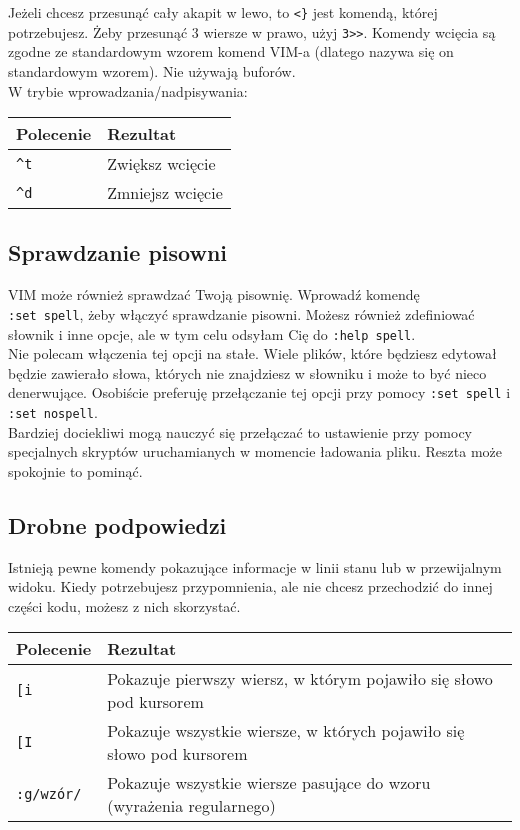 \documentclass[a4paper,12pt]{article}
\begin{document}
\noindent
Jeżeli chcesz przesunąć cały akapit w lewo, to {\tt <\}} jest komendą, której potrzebujesz. Żeby przesunąć 3 wiersze w prawo, użyj {\tt 3>>}. Komendy wcięcia są zgodne ze standardowym wzorem komend VIM-a (dlatego nazywa się on standardowym wzorem). Nie używają buforów.\\
W trybie wprowadzania/nadpisywania:

\begin{tabular}{ l | p{} } 
{\bf Polecenie} & {\bf Rezultat} \\ \hline
{\tt \^{}t} & Zwiększ wcięcie \\
{\tt \^{}d} & Zmniejsz wcięcie \\ \hline
\end{tabular}
\subsection{Sprawdzanie pisowni}
VIM może również sprawdzać Twoją pisownię. Wprowadź komendę\\{\tt :set spell}, żeby włączyć sprawdzanie pisowni. Możesz również zdefiniować słownik i inne opcje, ale w tym celu odsyłam Cię do {\tt :help spell}.\\
Nie polecam włączenia tej opcji na stałe. Wiele plików, które będziesz edytował będzie zawierało słowa, których nie znajdziesz w słowniku i może to być nieco denerwujące. Osobiście preferuję przełączanie tej opcji przy pomocy {\tt :set spell} i {\tt :set nospell}.\\
Bardziej dociekliwi mogą nauczyć się przełączać to ustawienie przy pomocy specjalnych skryptów uruchamianych w momencie ładowania pliku. Reszta może spokojnie to pominąć.\\
\subsection{Drobne podpowiedzi}
Istnieją pewne komendy pokazujące informacje w linii stanu lub w przewijalnym widoku. Kiedy potrzebujesz przypomnienia, ale nie chcesz przechodzić do innej części kodu, możesz z nich skorzystać.

\begin{tabular}{ l | p{} } 
{\bf Polecenie} & {\bf Rezultat} \\ \hline
{\tt [i} & Pokazuje pierwszy wiersz, w którym pojawiło się słowo pod kursorem \\
{\tt [I} & Pokazuje wszystkie wiersze, w których pojawiło się słowo pod kursorem \\
{\tt :g/wzór/} & Pokazuje wszystkie wiersze pasujące do wzoru (wyrażenia regularnego)\\ \hline
\end{tabular}
\end{document}
